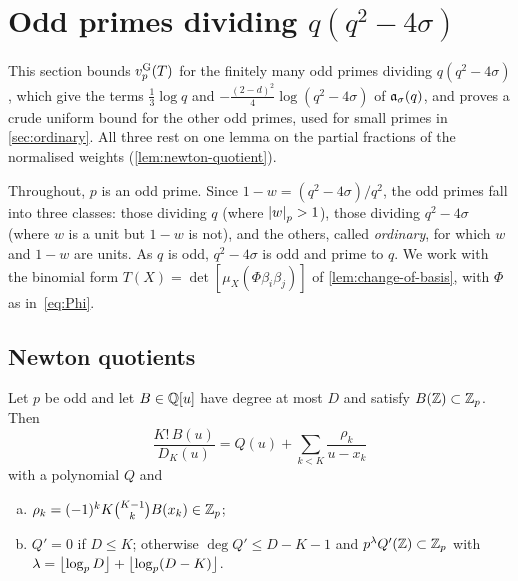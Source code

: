 \section{Odd primes dividing \texorpdfstring{$q(q^2-4\sigma)$}{q(q²-4σ)}}\label{sec:exceptional}

This section bounds $v_{p}^{\mathrm{G}}(T)$ for the finitely many odd primes dividing $q(q^2-4\sigma)$, which
give the terms $\frac13\log q$ and $-\frac{(2-d)^2}{4}\log(q^2-4\sigma)$ of $\mathfrak{a}_\sigma(q)$,
and proves a crude uniform bound for the other odd primes, used for small primes in
\cref{sec:ordinary}. All three rest on one lemma on the partial fractions of the normalised
weights (\cref{lem:newton-quotient}).

Throughout, $p$ is an odd prime. Since $1-w=(q^2-4\sigma)/q^2$, the odd primes fall into three
classes: those dividing $q$ (where $\left\lvert w\right\rvert_p>1$), those dividing $q^2-4\sigma$ (where $w$ is a unit
but $1-w$ is not), and the others, called \emph{ordinary}, for which $w$ and $1-w$ are units. As
$q$ is odd, $q^2-4\sigma$ is odd and prime to $q$. We work with the binomial form
$T(X)=\det[\mu_X(\Phi\beta_i\beta_j)]$ of \cref{lem:change-of-basis}, with $\Phi$ as
in~\eqref{eq:Phi}.

\subsection{Newton quotients}\label{subsec:newton}

\begin{lemma}\label{lem:newton-quotient}
Let $p$ be odd and let $B\in\mathbb{Q}[u]$ have degree at most $D$ and satisfy $B(\mathbb{Z})\subset\mathbb{Z}_p$. Then
\[
  \frac{K!\,B(u)}{D_K(u)}=Q(u)+\sum_{k<K}\frac{\rho_k}{u-x_k}
\]
with a polynomial $Q$ and
\begin{enumerate}[(a)]
\item $\rho_k=(-1)^kK\binom{K-1}{k}B(x_k)\in\mathbb{Z}_p$;
\item $Q'=0$ if $D\le K$; otherwise $\deg Q'\le D-K-1$ and $p^{\lambda}Q'(\mathbb{Z})\subset\mathbb{Z}_p$
with $\lambda=\left\lfloor \log_pD\right\rfloor+\left\lfloor \log_p(D-K)\right\rfloor$.
\end{enumerate}
\end{lemma}

